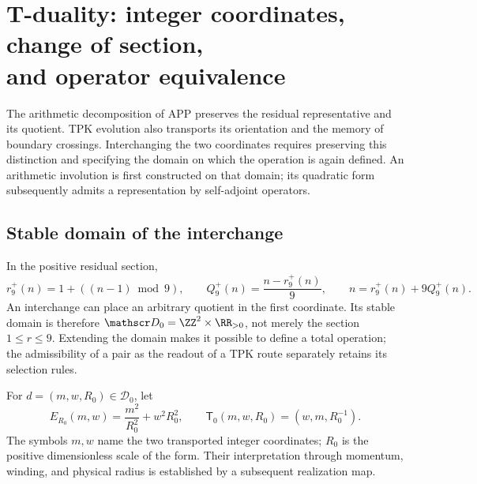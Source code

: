 \section[T-duality: integer coordinates, change of section, and operator equivalence]{T-duality: integer coordinates, change of section,\protect\\and operator equivalence}
\label{iv:dualidad}

The arithmetic decomposition of APP preserves the residual representative
and its quotient. TPK evolution also transports its orientation and
the memory of boundary crossings. Interchanging the two
coordinates requires preserving this distinction and specifying the domain
on which the operation is again defined. An arithmetic involution is
first constructed on that domain; its quadratic form
subsequently admits a representation by self-adjoint operators.

\subsection{Stable domain of the interchange}

In the positive residual section,
\begin{equation}
 r_9^+(n)=1+((n-1)\bmod9),\qquad
 Q_9^+(n)=\frac{n-r_9^+(n)}9,
 \qquad n=r_9^+(n)+9Q_9^+(n).
 \label{iv:eq:division-positiva}
\end{equation}
An interchange can place an arbitrary quotient in the first
coordinate. Its stable domain is therefore
\(\mathscr D_0=\ZZ^2\times\RR_{>0}\), not merely the section
\(1\leq r\leq9\). Extending the domain makes it possible to define
a total operation; the admissibility of a pair as the readout of
a TPK route separately retains its selection rules.

\begin{definition}
\label{iv:def:dualidad}
For \(d=(m,w,R_0)\in\mathscr D_0\), let
\begin{equation}
 E_{R_0}(m,w)=\frac{m^2}{R_0^2}+w^2R_0^2,
 \qquad
 \mathsf T_0(m,w,R_0)=(w,m,R_0^{-1}).
 \label{iv:eq:energia-t}
\end{equation}
The symbols \(m,w\) name the two transported integer
coordinates; \(R_0\) is the positive dimensionless scale of
the form. Their interpretation through momentum, winding, and
physical radius is established by a subsequent realization map.
\end{definition}

